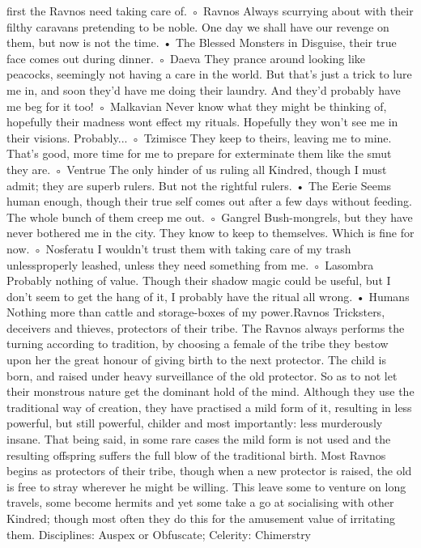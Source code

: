 \documentclass[10pt,a4paper]{article}
\begin{document}
first the Ravnos need taking care of.
◦ Ravnos
Always scurrying about with their filthy caravans pretending to
be noble. One day we shall have our revenge on them, but now
is not the time.
• The Blessed
Monsters in Disguise, their true face comes out during dinner.
◦ Daeva
They prance around looking like peacocks, seemingly not having
a care in the world. But that's just a trick to lure me in, and soon
they'd have me doing their laundry. And they'd probably have me
beg for it too!
◦ Malkavian
Never know what they might be thinking of, hopefully their
madness wont effect my rituals. Hopefully they won't see me in
their visions. Probably...
◦ Tzimisce
They keep to theirs, leaving me to mine. That's good, more time
for me to prepare for exterminate them like the smut they are.
◦ Ventrue
The only hinder of us ruling all Kindred, though I must admit;
they are superb rulers. But not the rightful rulers.
• The Eerie
Seems human enough, though their true self comes out after a few
days without feeding. The whole bunch of them creep me out.
◦ Gangrel
Bush-mongrels, but they have never bothered me in the city.
They know to keep to themselves. Which is fine for now.
◦ Nosferatu
I wouldn't trust them with taking care of my trash unlessproperly leashed, unless they need something from me.
◦ Lasombra
Probably nothing of value. Though their shadow magic could be
useful, but I don't seem to get the hang of it, I probably have the
ritual all wrong.
• Humans
Nothing more than cattle and storage-boxes of my power.Ravnos
Tricksters, deceivers and thieves, protectors of their tribe.
The Ravnos always performs the turning according to tradition, by choosing
a female of the tribe they bestow upon her the great honour of giving birth
to the next protector. The child is born, and raised under heavy surveillance
of the old protector. So as to not let their monstrous nature get the dominant
hold of the mind. Although they use the traditional way of creation, they
have practised a mild form of it, resulting in less powerful, but still
powerful, childer and most importantly: less murderously insane. That being
said, in some rare cases the mild form is not used and the resulting offspring
suffers the full blow of the traditional birth.
Most Ravnos begins as protectors of their tribe, though when a new
protector is raised, the old is free to stray wherever he might be willing.
This leave some to venture on long travels, some become hermits and yet
some take a go at socialising with other Kindred; though most often they do
this for the amusement value of irritating them.
Disciplines: Auspex or Obfuscate; Celerity: Chimerstry
\end{document}
